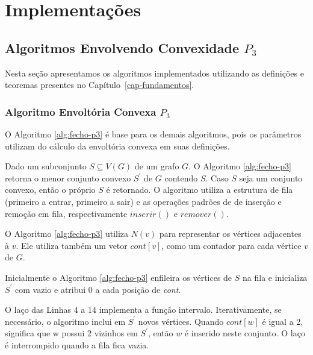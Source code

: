 \chapter{Implementações}
\label{implementa}

\section{Algoritmos Envolvendo Convexidade $P_3$}

Nesta seção apresentamos os algoritmos implementados utilizando as definições e teoremas presentes no Capítulo~\ref{cap-fundamentos}.


\subsection{Algoritmo Envoltória Convexa $P_3$}

O Algoritmo \ref{alg:fecho-p3} é base para os demais algoritmos,
pois os parâmetros utilizam do cálculo da envoltória convexa em suas definições.

Dado um subconjunto $S \subseteq V(G)$ de um grafo $G$.
O Algoritmo \ref{alg:fecho-p3} retorna o menor conjunto convexo $S^\prime$ de $G$ contendo $S$.
Caso $S$ seja um conjunto convexo, então o próprio $S$ é retornado.
O algoritmo utiliza a estrutura de fila (primeiro a entrar, primeiro a sair)
e as operações padrões de de inserção e remoção em fila, respectivamente $inserir()$ e $remover()$.

O Algoritmo \ref{alg:fecho-p3} utiliza $N(v)$ para representar os vértices adjacentes à $v$.
Ele utiliza também um vetor $cont[v]$, como um contador para cada vértice $v$ de $G$.

Inicialmente o Algoritmo \ref{alg:fecho-p3} enfileira os vértices de $S$ na fila e inicializa $S^\prime$ com vazio e atribui 0 a cada posição de 
\textit{cont}.

O laço das Linhas 4 a 14 implementa a função intervalo. Iterativamente, se necessário, o algoritmo inclui em $S^\prime$ novos vértices.
Quando $cont[w]$ é igual a 2, significa que w possui 2 vizinhos em $S^\prime$, então $w$ é inserido neste conjunto. 
O laço é interrompido quando a fila fica vazia.

